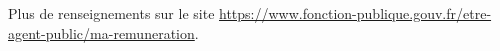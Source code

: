 Plus de renseignements sur le site \url{https://www.fonction-publique.gouv.fr/etre-agent-public/ma-remuneration}.



%
%
%
%
%
%
